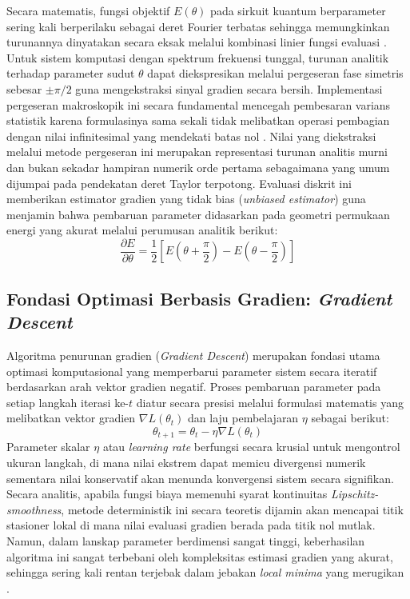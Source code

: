 Secara matematis, fungsi objektif $E(\theta)$ pada sirkuit kuantum berparameter sering kali berperilaku sebagai deret Fourier terbatas sehingga memungkinkan turunannya dinyatakan secara eksak melalui kombinasi linier fungsi evaluasi \cite{wierichs_general_2022}. Untuk sistem komputasi dengan spektrum frekuensi tunggal, turunan analitik terhadap parameter sudut $\theta$ dapat diekspresikan melalui pergeseran fase simetris sebesar $\pm \pi/2$ guna mengekstraksi sinyal gradien secara bersih. Implementasi pergeseran makroskopik ini secara fundamental mencegah pembesaran varians statistik karena formulasinya sama sekali tidak melibatkan operasi pembagian dengan nilai infinitesimal yang mendekati batas nol \cite{mitarai_quantum_2018}. Nilai yang diekstraksi melalui metode pergeseran ini merupakan representasi turunan analitis murni dan bukan sekadar hampiran numerik orde pertama sebagaimana yang umum dijumpai pada pendekatan deret Taylor terpotong. Evaluasi diskrit ini memberikan estimator gradien yang tidak bias (\textit{unbiased estimator}) guna menjamin bahwa pembaruan parameter didasarkan pada geometri permukaan energi yang akurat melalui perumusan analitik berikut:
\begin{equation}
\frac{\partial E}{\partial \theta} = \frac{1}{2} \left[ E\left(\theta + \frac{\pi}{2}\right) - E\left(\theta - \frac{\pi}{2}\right) \right]
\end{equation}

\subsection{Fondasi Optimasi Berbasis Gradien: \textit{Gradient Descent}}
Algoritma penurunan gradien (\textit{Gradient Descent}) merupakan fondasi utama optimasi komputasional yang memperbarui parameter sistem secara iteratif berdasarkan arah vektor gradien negatif. Proses pembaruan parameter pada setiap langkah iterasi ke-$t$ diatur secara presisi melalui formulasi matematis yang melibatkan vektor gradien $\nabla L(\theta_t)$ dan laju pembelajaran $\eta$ sebagai berikut:
\begin{equation}
\theta_{t+1} = \theta_t - \eta \nabla L(\theta_t)
\end{equation}
Parameter skalar $\eta$ atau \textit{learning rate} berfungsi secara krusial untuk mengontrol ukuran langkah, di mana nilai ekstrem dapat memicu divergensi numerik sementara nilai konservatif akan menunda konvergensi sistem secara signifikan. Secara analitis, apabila fungsi biaya memenuhi syarat kontinuitas \textit{Lipschitz-smoothness}, metode deterministik ini secara teoretis dijamin akan mencapai titik stasioner lokal di mana nilai evaluasi gradien berada pada titik nol mutlak. Namun, dalam lanskap parameter berdimensi sangat tinggi, keberhasilan algoritma ini sangat terbebani oleh kompleksitas estimasi gradien yang akurat, sehingga sering kali rentan terjebak dalam jebakan \textit{local minima} yang merugikan \cite{mcclean_barren_2018}.

